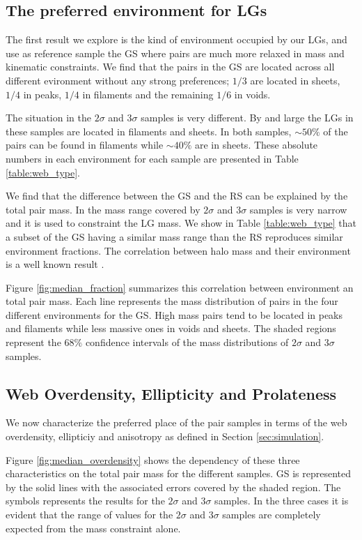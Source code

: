 \documentclass{emulateapj}
\begin{document}
\subsection{The preferred environment for LGs}

The first result we explore is the kind of environment occupied by
our LGs, and use as reference sample the GS where pairs are much more
relaxed in mass and kinematic constraints.
We find that the pairs in the GS are located across all different
evironment without any strong preferences; $1/3$  are located in
sheets, $1/4$ in peaks, $1/4$ in filaments and the remaining $1/6$ in
voids.  

The situation in the $2\sigma$ and $3\sigma$ samples is very
different. 
By and large the LGs in these samples are located in filaments and sheets. 
In both samples, $\sim 50\%$ of the pairs can be found in filaments
while $\sim 40\%$ are in sheets. 
These absolute numbers in each environment for each sample are
presented in Table \ref{table:web_type}.  

We find that the difference between the GS and the RS 
can be explained by the total pair mass.
In \citet{lganalogues} the mass range covered by $2\sigma$ and $3\sigma$ 
samples is very narrow and it is used to constraint the LG mass.
We show in Table \ref{table:web_type} that a subset of the GS
having a similar mass range than the RS reproduces similar environment
fractions. The correlation between halo mass and their environment is a
well known result \citep{1998ApJ...500...14L}.

Figure \ref{fig:median_fraction} summarizes this correlation between
environment an total pair mass.
Each line represents the mass distribution of pairs in the four
different environments for the GS.
High mass pairs tend to be located in  peaks and filaments while less
massive ones in voids and sheets. 
The shaded regions represent the $68\%$ confidence intervals of the mass 
distributions of $2\sigma$ and $3\sigma$ samples.


\subsection{Web Overdensity, Ellipticity and Prolateness}

We now characterize the preferred place of the pair samples in terms of the
web overdensity, ellipticiy and anisotropy as defined in Section
\ref{sec:simulation}. 

Figure \ref{fig:median_overdensity} shows the dependency of these three
characteristics  on the total pair mass for the different samples.
GS is represented by the solid lines with the associated 
errors covered by the shaded region. 
The symbols represents the results for the $2\sigma$ and $3\sigma$
samples.   
In the three cases it is evident that the range of values for the
$2\sigma$ and $3\sigma$ samples are completely expected from the mass
constraint alone.
\end{document}
